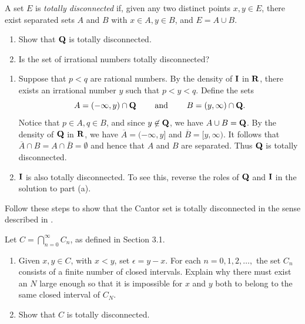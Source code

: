 \documentclass{lew98_solutions}
\begin{document}
\begin{exercise}
\label{ex:3.4.7}
    A set \( E \) is \textit{totally disconnected} if, given any two distinct points \( x, y \in E \), there exist separated sets \( A \) and \( B \) with \( x \in A, y \in B \), and \( E = A \cup B \).
    \begin{enumerate}
        \item Show that \( \mathbf{Q} \) is totally disconnected.
        
        \item Is the set of irrational numbers totally disconnected?
    \end{enumerate}
\end{exercise}

\begin{solution}
    \begin{enumerate}
        \item Suppose that \( p < q \) are rational numbers. By the density of \( \mathbf{I} \) in \( \mathbf{R} \), there exists an irrational number \( y \) such that \( p < y < q \). Define the sets
        \[
            A = (-\infty, y) \cap \mathbf{Q} \hspace{8mm} \text{and} \hspace{8mm} B = (y, \infty) \cap \mathbf{Q}.
        \]
        Notice that \( p \in A, q \in B \), and since \( y \not\in \mathbf{Q} \), we have \( A \cup B = \mathbf{Q} \). By the density of \( \mathbf{Q} \) in \( \mathbf{R} \), we have \( \overline{A} = (-\infty, y] \) and \( \overline{B} = [y, \infty) \). It follows that \( \overline{A} \cap B = A \cap \overline{B} = \emptyset \) and hence that \( A \) and \( B \) are separated. Thus \( \mathbf{Q} \) is totally disconnected.

        \item \( \mathbf{I} \) is also totally disconnected. To see this, reverse the roles of \( \mathbf{Q} \) and \( \mathbf{I} \) in the solution to part (a).
    \end{enumerate}
\end{solution}

\begin{exercise}
\label{ex:3.4.8}
    Follow these steps to show that the Cantor set is totally disconnected in the sense described in .

    Let \( C = \bigcap_{n=0}^{\infty} C_n \), as defined in Section 3.1.
    \begin{enumerate}
        \item Given \( x, y \in C \), with \( x < y \), set \( \epsilon = y - x \). For each \( n = 0, 1, 2, \ldots, \) the set \( C_n \) consists of a finite number of closed intervals. Explain why there must exist an \( N \) large enough so that it is impossible for \( x \) and \( y \) both to belong to the same closed interval of \( C_N \).

        \item Show that \( C \) is totally disconnected.
    \end{enumerate}
\end{exercise}
\end{document}
